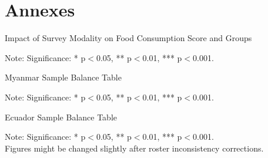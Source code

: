 \documentclass[11pt,harvard]{article}
\begin{document}
\pagebreak

\section{Annexes}

	\begin{table}[htbp]
	\centering
	\begin{adjustbox}{max width=\textwidth}
		\begin{threeparttable}
			\caption{Impact of Survey Modality on Food Consumption Score and Groups}
			\scriptsize
			 
			\label{tab:FCS_Modality_All_Country_Short}
			\begin{tablenotes}
				\item Note: Significance: * p$<$0.05, ** p$<$0.01, *** p$<$0.001. 
			\end{tablenotes}
		\end{threeparttable}
	\end{adjustbox}
\end{table}


	\begin{table}[htbp]
	\centering
	\begin{adjustbox}{max width=\textwidth}
		\begin{threeparttable}
			\caption{Myanmar Sample Balance Table}
			\scriptsize
			 
			\label{tab:Myanmar_Modality_Demo_Balance}
			\begin{tablenotes}
				\item Note: Significance: * p$<$0.05, ** p$<$0.01, *** p$<$0.001. 
			\end{tablenotes}
		\end{threeparttable}
	\end{adjustbox}
\end{table}


\begin{table}[htbp]
	\centering
	\begin{adjustbox}{max width=\textwidth}
		\begin{threeparttable}
			\caption{Ecuador Sample Balance Table}
			\scriptsize
			 
			\label{tab:Ecuador_Modality_Demo_Balance}
			\begin{tablenotes}
				\item Note: Significance: * p$<$0.05, ** p$<$0.01, *** p$<$0.001. \\
						 Figures might be changed slightly after roster inconsistency corrections.
			\end{tablenotes}
		\end{threeparttable}
	\end{adjustbox}
\end{table}
\end{document}

